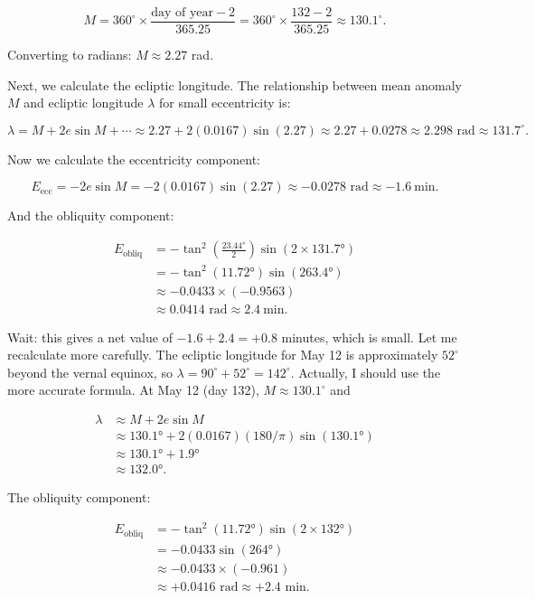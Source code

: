 \[
  M = 360^{\circ} \times \frac{\text{day of year} - 2}{365.25} = 360^{\circ} \times \frac{132 - 2}{365.25} \approx 130.1^{\circ}.
\]

Converting to radians: $M \approx 2.27$ rad.

Next, we calculate the ecliptic longitude. The relationship between mean anomaly $M$ and ecliptic longitude $\lambda$ for small eccentricity is:

\[
  \lambda = M + 2e \sin M + \cdots \approx 2.27 + 2(0.0167) \sin(2.27) \approx 2.27 + 0.0278 \approx 2.298 \text{ rad} \approx 131.7^{\circ}.
\]

Now we calculate the eccentricity component:

\[
  E_{\text{ecc}} = -2e \sin M = -2(0.0167) \sin(2.27) \approx -0.0278 \text{ rad} \approx \SI{-1.6}{\minute}.
\]

And the obliquity component:

\begin{align*}
  E_{\text{obliq}} &= -\tan^2 \left(\frac{23.44°}{2}\right) \sin(2 \times 131.7°) \\
  &= -\tan^2(11.72°) \sin(263.4°) \\
  &\approx -0.0433 \times (-0.9563) \\
  &\approx 0.0414 \text{ rad} \approx \SI{+2.4}{\minute}.
\end{align*}

Wait: this gives a net value of $-1.6 + 2.4 = +0.8$ minutes, which is small. Let me recalculate more carefully. The ecliptic longitude for May 12 is approximately $52^{\circ}$ beyond the vernal equinox, so $\lambda = 90^{\circ} + 52^{\circ} = 142^{\circ}$. Actually, I should use the more accurate formula. At May 12 (day 132), $M \approx 130.1^{\circ}$ and 

\begin{align*}
  \lambda &\approx M + 2e \sin M \\
  &\approx 130.1° + 2(0.0167)(180/\pi) \sin(130.1°) \\
  &\approx 130.1° + 1.9° \\
  &\approx 132.0°.
\end{align*}

The obliquity component: 

\begin{align*}
  E_{\text{obliq}} &= -\tan^2(11.72°) \sin(2 \times 132°) \\
  &= -0.0433 \sin(264°) \\
  &\approx -0.0433 \times (-0.961) \\
  &\approx +0.0416 \text{ rad} \approx +2.4 \text{ min}.
\end{align*}

